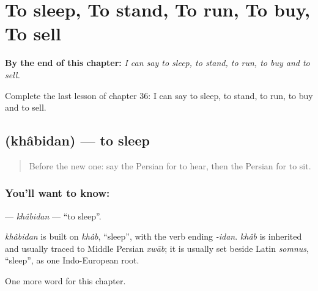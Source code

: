 
\chapter{To sleep, To stand, To run, To buy, To sell}
\label{ch:fa-to-sleep-to-stand-to-run-to-buy-to-sell}

\begin{chapteropening}
\textbf{By the end of this chapter:} \emph{I can say to sleep, to stand, to run, to buy and to sell.}

Complete the last lesson of chapter 36: I can say to sleep, to stand, to run, to buy and to sell.
\end{chapteropening}

\section[\texorpdfstring{\fa{خوابیدن} (khâbidan)}{خوابیدن (khâbidan)}]{ (khâbidan) — to sleep}

\label{lesson:FA-C36-khabidan}



\begin{quote}
Before the new one: say the Persian for to hear, then the Persian for to sit.
\end{quote}

\subsection*{You'll want to know: }
\textbf{} — \emph{khâbidan} — \textquotedblleft{}to sleep\textquotedblright{}.

\begin{cousinweb}
\emph{khâbidan} is built on \emph{khâb}, \textquotedblleft{}sleep\textquotedblright{}, with the verb ending \emph{-idan}. \emph{khâb} is inherited and usually traced to Middle Persian \emph{xwāb}; it is usually set beside Latin \emph{somnus}, \textquotedblleft{}sleep\textquotedblright{}, as one Indo-European root.
\end{cousinweb}

\begin{grammarlens}[title={What you've built}]
One more word for this chapter.
\end{grammarlens}

